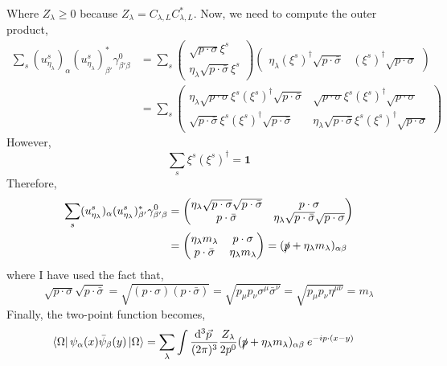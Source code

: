 \documentclass[12pt]{article}
\begin{document}
Where $Z_\lambda \ge 0$ because $Z_\lambda = C_{\lambda, L} C_{\lambda, L}^*$.
Now, we need to compute the outer product,
\begin{align*} 
\sum_{s} (u^s_{\eta_\lambda})_{\alpha} (u^s_{\eta_\lambda})_{\beta'}^* \gamma^0_{\beta' \beta} & = 
\sum_{s} \begin{pmatrix}
\sqrt{p \cdot \sigma} \xi^s \\
\eta_\lambda \sqrt{p \cdot \bar{\sigma}} \xi^s
\end{pmatrix}
\begin{pmatrix}
\eta_\lambda  (\xi^s)^\dagger \sqrt{p \cdot \bar{\sigma}}  &  (\xi^s)^\dagger \sqrt{p \cdot \sigma}
\end{pmatrix}
\\
& = \sum_{s}
\begin{pmatrix}
\eta_\lambda \sqrt{p \cdot \sigma} \xi^s (\xi^s)^\dagger \sqrt{p \cdot \bar{\sigma}} & \sqrt{p \cdot \sigma} \xi^s (\xi^s)^\dagger \sqrt{p \cdot \sigma} 
\\
\sqrt{p \cdot \bar{\sigma}} \xi^s (\xi^s)^\dagger \sqrt{p \cdot \bar{\sigma}} & \eta_\lambda \sqrt{p \cdot \bar{\sigma}} \xi^s (\xi^s)^\dagger \sqrt{p \cdot \sigma} 
\end{pmatrix}
\end{align*}
However,
\[ \sum_{s} \xi^s (\xi^s)^\dagger = \mathbf{1} \]
Therefore,
\begin{align*} 
\sum_{s} (u^s_{\eta_\lambda})_{\alpha} (u^s_{\eta_\lambda})_{\beta'}^* \gamma^0_{\beta' \beta} & =
\begin{pmatrix}
\eta_\lambda \sqrt{p \cdot \sigma} \sqrt{p \cdot \bar{\sigma}} & p \cdot \sigma 
\\
p \cdot \bar{\sigma} & \eta_\lambda \sqrt{p \cdot \bar{\sigma}} \sqrt{p \cdot \sigma} 
\end{pmatrix}
\\
& =
\begin{pmatrix}
\eta_\lambda m_\lambda  & p \cdot \sigma 
\\
p \cdot \bar{\sigma} & \eta_\lambda m_\lambda
\end{pmatrix}
= (\slashed{p} + \eta_\lambda m_\lambda)_{\alpha \beta}
\end{align*}
where I have used the fact that,
\[ \sqrt{p \cdot \sigma} \sqrt{p \cdot \bar{\sigma}} = \sqrt{(p \cdot \sigma)(p \cdot \bar{\sigma})} = \sqrt{p_\mu p_\nu \sigma^\mu \bar{\sigma}^\nu} = \sqrt{p_\mu p_\nu \eta^{\mu \nu}} = m_\lambda \]
Finally, the two-point function becomes,
\begin{align*}
\left< \Omega \right| \psi_{\alpha}(x) \bar{\psi}_{\beta}(y) \left| \Omega \right> & = \sum_{\lambda} \int \frac{\mathrm{d}^{3} \vec{p} \:}{(2 \pi)^3} \frac{Z_{\lambda}}{2 p^0} (\slashed{p} + \eta_\lambda m_\lambda)_{\alpha \beta} \: e^{- i p \cdot (x - y) }
\end{align*}
\end{document}
